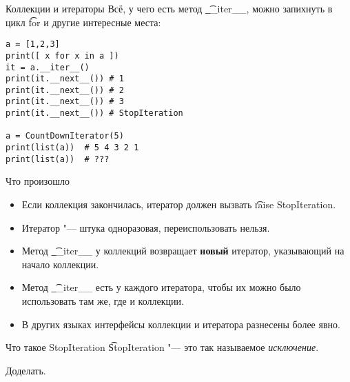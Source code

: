 \begin{frame}[fragile]{Коллекции и итераторы}
	Всё, у чего есть метод \t{\_\_iter\_\_}, можно запихнуть в цикл \t{for} и другие интересные места:
\begin{verbatim}
a = [1,2,3]
print([ x for x in a ])
it = a.__iter__()
print(it.__next__()) # 1
print(it.__next__()) # 2
print(it.__next__()) # 3
print(it.__next__()) # StopIteration

a = CountDownIterator(5)
print(list(a))  # 5 4 3 2 1
print(list(a))  # ???
\end{verbatim}
\end{frame}

\begin{frame}{Что произошло}
	\begin{itemize}
		\item Если коллекция закончилась, итератор должен вызвать \t{raise StopIteration}.
		\item Итератор "--- штука одноразовая, переиспользовать нельзя.
		\item Метод \t{\_\_iter\_\_} у коллекций возвращает \textbf{новый} итератор, указывающий на начало коллекции.
		\item Метод \t{\_\_iter\_\_} есть у каждого итератора, чтобы их можно было использовать там же, где и коллекции.
		\item В других языках интерфейсы коллекции и итератора разнесены более явно.
	\end{itemize}
\end{frame}

\begin{frame}{Что такое StopIteration}
	\t{StopIteration} "--- это так называемое \textit{исключение}.

	Доделать.
\end{frame}
